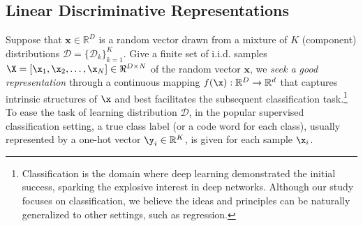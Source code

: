 \documentclass[../../book-main.tex]{subfiles}
\begin{document}





\subsection{Linear Discriminative Representations}\label{subsec:LDR}

Suppose that $\bm{x} \in \mathbb{R}^D$ is a random vector drawn from a mixture of $K$ (component) distributions  $\mathcal{D} = \{\mathcal{D}_k\}_{k=1}^K$. Give a finite set of i.i.d. samples $\X = [\x_1, \x_2, \ldots, \x_N] \in \Re^{D\times N}$ of the random vector $\bm x$, we {\em seek a good representation}  through a continuous mapping $f(\x): \mathbb{R}^D \rightarrow \mathbb{R}^d$ that captures intrinsic structures of $\x$ and best facilitates the subsequent classification task.\footnote{Classification is the domain where deep learning demonstrated the initial success, sparking the explosive interest in deep networks. Although our study focuses on classification, we believe the ideas and principles can be naturally generalized to other settings, such as regression.} To ease the task of learning distribution $\mathcal{D}$, in the popular supervised classification setting, a true class label (or a code word for each class), usually represented by a one-hot vector $\y_i \in \mathbb{R}^K$, is given for each sample $\x_i$.

 

\end{document}
